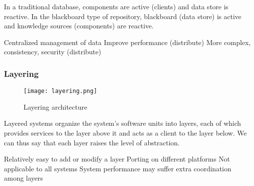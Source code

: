 In a traditional database, components are active (clients) and data store is
reactive. In the blackboard type of repository, blackboard (data store) is
active and knowledge sources (components) are reactive.

\begin{itemize}
    \proitem{} Centralized management of data
    \proitem{} Improve performance (distribute)
    \consitem{} More complex, consistency, security (distribute)
\end{itemize}

\subsubsection{Layering}

\begin{figure}[!ht]
    \centering
    \texttt{[image: layering.png]}
    \caption{Layering architecture}
\end{figure}

Layered systems organize the system’s software units into layers, each of which
provides services to the layer above it and acts as a client to the layer below.
We can thus say that each layer raises the level of abstraction.

\begin{itemize}
    \proitem{} Relatively easy to add or modify a layer
    \proitem{} Porting on different platforms
    \consitem{} Not applicable to all systems
    \consitem{} System performance may suffer extra coordination among layers
\end{itemize}
